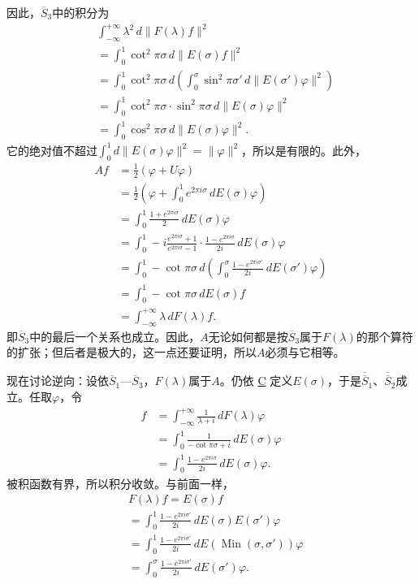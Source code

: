 \documentclass[fontsize=13pt,twoside,openany,headings=normal,parskip=false,bookmarkpackage=false,DIV=calc]{scrbook}
\begin{document}
\hypertarget{origpage-83}{}\label{origpage-83}因此，$\hyperref[cond:II.Sbar3]{\overline S_3}$中的积分为
\begin{align*}
&\int_{-\infty}^{+\infty}\lambda^2\,d\|F(\lambda)f\|^2\\
&=\int_0^1\cot^2\pi\sigma\,d\|E(\sigma)f\|^2\\
&=\int_0^1\cot^2\pi\sigma\,
d\left(\int_0^\sigma\sin^2\pi\sigma'\,d\|E(\sigma')\varphi\|^2\right)\\
&=\int_0^1\cot^2\pi\sigma\cdot\sin^2\pi\sigma\,d\|E(\sigma)\varphi\|^2\\
&=\int_0^1\cos^2\pi\sigma\,d\|E(\sigma)\varphi\|^2.
\end{align*}
它的绝对值不超过$\int_0^1d\|E(\sigma)\varphi\|^2=\|\varphi\|^2$，所以是有限的。此外，
\begin{align*}
Af&=\frac12(\varphi+U\varphi)\\
&=\frac12\left(\varphi+\int_0^1e^{2\pi i\sigma}\,dE(\sigma)\varphi\right)\\
&=\int_0^1\frac{1+e^{2\pi i\sigma}}2\,dE(\sigma)\varphi\\
&=\int_0^1-i\frac{e^{2\pi i\sigma}+1}{e^{2\pi i\sigma}-1}\cdot
\frac{1-e^{2\pi i\sigma}}{2i}\,dE(\sigma)\varphi\\
&=\int_0^1-\cot\pi\sigma\,
d\left(\int_0^\sigma\frac{1-e^{2\pi i\sigma'}}{2i}\,dE(\sigma')\varphi\right)\\
&=\int_0^1-\cot\pi\sigma\,dE(\sigma)f\\
&=\int_{-\infty}^{+\infty}\lambda\,dF(\lambda)f.
\end{align*}
即$\hyperref[cond:II.Sbar3]{\overline S_3}$中的最后一个关系也成立。因此，$A$无论如何都是按$\hyperref[cond:II.Sbar3]{\overline S_3}$属于$F(\lambda)$的那个算符的扩张；但后者是极大的，这一点还要证明，所以$A$必须与它相等。

现在讨论逆向：设依$\hyperref[cond:II.Sbar1]{\overline S_1}$—$\hyperref[cond:II.Sbar3]{\overline S_3}$，$F(\lambda)$属于$A$。仍依 \hyperref[eq:II.9.C]{C} 定义$E(\sigma)$，于是$\hyperref[cond:II.Sdouble1]{\overline{\overline S}_1}$、$\hyperref[cond:II.Sdouble2]{\overline{\overline S}_2}$成立。任取$\varphi$，令
\begin{align*}
f&=\int_{-\infty}^{+\infty}\frac1{\lambda+i}\,dF(\lambda)\varphi\\
&=\int_0^1\frac1{-\cot\pi\sigma+i}\,dE(\sigma)\varphi\\
&=\int_0^1\frac{1-e^{2\pi i\sigma}}{2i}\,dE(\sigma)\varphi.
\end{align*}
被积函数有界，所以积分收敛。与前面一样，
\begin{align*}
&F(\lambda)f=E(\sigma)f\\
&=\int_0^1\frac{1-e^{2\pi i\sigma'}}{2i}\,dE(\sigma)E(\sigma')\varphi\\
&=\int_0^1\frac{1-e^{2\pi i\sigma'}}{2i}\,dE(\operatorname{Min}(\sigma,\sigma'))\varphi\\
&=\int_0^\sigma\frac{1-e^{2\pi i\sigma'}}{2i}\,dE(\sigma')\varphi.
\end{align*}
\end{document}
